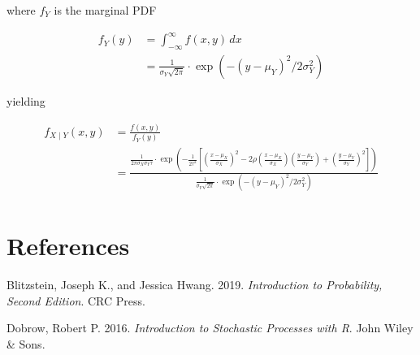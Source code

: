 \documentclass[
  11pt]{report}
\newlength{\cslhangindent}
\newlength{\cslentryspacingunit} %
\newenvironment{CSLReferences}[2] %
 {%
  \setlength{\parindent}{0pt}
  \ifodd #1
  \let\oldpar\par
  \def\par{\hangindent=\cslhangindent\oldpar}
  \fi
  \setlength{\parskip}{#2\cslentryspacingunit}
 }%
 {}
\begin{document}
\begin{itemize}
  where $f_Y$ is the marginal PDF

  \[
  \begin{aligned}
  f_Y(y) &= \int_{-\infty}^\infty f(x, y)\, dx \\
  &= \frac{1}{\sigma_Y \sqrt{2\pi}} 
     \cdot 
     \exp\left( -(y - \mu_Y)^2 / 2 \sigma_Y^2 \right)
  \end{aligned}
  \]

  yielding

  \[
  \begin{aligned}
  f_{X \mid Y} (x, y) 
  &= \frac{f(x, y)}{f_Y(y)} \\
  &= \frac{
    {
      \frac {1}
      {
        2\pi \sigma _{X}\sigma _{Y}\tau
      }
    }\cdot \exp \left(
      -{
        \frac {1}{2\tau^2}
      }\left[
        \left(
          {\frac {x-\mu _{X}}{\sigma_{X}}}
        \right)^{2} -
        2\rho \left(
          {\frac {x-\mu _{X}}{\sigma_{X}}}
        \right)
        \left(
          {\frac {y-\mu _{Y}}{\sigma_{Y}}}
        \right) +
        \left(
          {\frac {y-\mu _{Y}}{\sigma_{Y}}}
        \right)^{2}
      \right]
    \right)
  }{
    \frac{1}{\sigma_Y \sqrt{2\pi}} 
       \cdot 
       \exp\left( -(y - \mu_Y)^2 / 2 \sigma_Y^2 \right)
    } 
  \\
  \end{aligned}
  \]
\end{itemize}

\hypertarget{references}{%
\chapter*{References}\label{references}}

\hypertarget{refs}{}
\begin{CSLReferences}{1}{0}
\leavevmode{}%
Blitzstein, Joseph K., and Jessica Hwang. 2019. \emph{Introduction to Probability, Second Edition}. CRC Press.

\leavevmode{}%
Dobrow, Robert P. 2016. \emph{Introduction to Stochastic Processes with {R}}. John Wiley \& Sons.

\end{CSLReferences}
\end{document}
